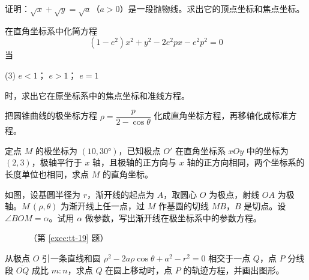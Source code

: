 \begin{question}
  \item 证明：$\sqrt{x}+\sqrt{y}=\sqrt{a}$（$a>0$）是一段抛物线。求出它的顶点坐标和焦点坐标。
  \item 在直角坐标系中化简方程
  \[(1-e^2)x^2+y^2-2e^2px-e^2p^2=0\]
  当
  \begin{tasks}(3)
    \task $e<1$；
    \task $e>1$；
    \task $e=1$
  \end{tasks}
  时，求出它在原坐标系中的焦点坐标和准线方程。
  \item 把圆锥曲线的极坐标方程 $\rho=\dfrac{p}{2-\cos\theta}$ 化成直角坐标方程，再移轴化成标准方程。
  \item 定点 $M$ 的极坐标为 $(10,\ang{30})$，已知极点 $O'$ 在直角坐标系 $xOy$ 中的坐标为 $(2,3)$，极轴平行于 $x$ 轴，且极轴的正方向与 $x$ 轴的正方向相同，两个坐标系的长度单位也相同，求点 $M$ 的直角坐标。
  \item\label{exec:tt-19} 如图，设基圆半径为 $r$，渐开线的起点为 $A$，取圆心 $O$ 为极点，射线 $OA$ 为极轴。$M\,(\rho,\theta)$ 为渐开线上任一点，过 $M$ 作基圆的切线 $MB$，$B$ 是切点。设 $\angle BOM=\alpha$。试用 $\alpha$ 做参数，写出渐开线在极坐标系中的参数方程。
  \begin{figure}
    \caption*{（第 \ref{exec:tt-19} 题）}
  \end{figure}
  \item 从极点 $O$ 引一条直线和圆 $\rho^2-2a\rho\cos\theta+ a^2-r^2=0$ 相交于一点 $Q$，点 $P$ 分线段 $\overline{OQ}$ 成比 $m:n$，求点 $Q$ 在圆上移动时，点 $P$ 的轨迹方程，并画出图形。
\end{question}
